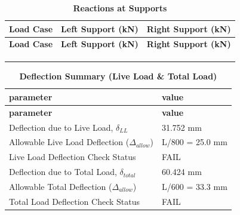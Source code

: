 \documentclass[12pt,a4paper]{report}
\numberwithin{table}{chapter}
\numberwithin{figure}{chapter}
\begin{document}
\vspace{1em}
\begin{longtable}{|>{\centering\arraybackslash}p{5.2cm}|>{\centering\arraybackslash}p{5.2cm}|>{\centering\arraybackslash}p{5.2cm}|}
\caption{\textbf{Reactions at Supports}}
\hline
\textbf{Load Case} & \textbf{Left Support (kN)} & \textbf{Right Support (kN)} \\[6pt]
\hline
\endfirsthead
\textbf{Load Case} & \textbf{Left Support (kN)} & \textbf{Right Support (kN)} \\[6pt]
\hline
\endhead
 &  &  \\[6pt]
\hline
 &  &  \\[6pt]
\hline
 &  &  \\[6pt]
\hline
\end{longtable}

\vspace{1em}
\begin{longtable}{|L{7cm}|p{8.5cm}|}
\caption{\textbf{Deflection Summary (Live Load \& Total Load)}}
\hline
\textbf{parameter} & \textbf{value} \\
\hline
\endfirsthead
\textbf{parameter} & \textbf{value} \\
\hline
\endhead
\textnormal{Deflection due to Live Load, $\delta_{LL}$} & 31.752 mm \\[6pt]
\hline
\textnormal{Allowable Live Load Deflection ($\Delta_{allow}$)} & L/800 = 25.0 mm \\[6pt]
\hline
\textnormal{Live Load Deflection Check Status} & \textcolor{reportFail}{FAIL} \\[6pt]
\hline
\textnormal{Deflection due to Total Load, $\delta_{total}$} & 60.424 mm \\[6pt]
\hline
\textnormal{Allowable Total Deflection ($\Delta_{allow}$)} & L/600 = 33.3 mm \\[6pt]
\hline
\textnormal{Total Load Deflection Check Status} & \textcolor{reportFail}{FAIL} \\[6pt]
\hline
\end{longtable}

\vspace{1em}
\noindent
\noindent{}
\noindent{}
\noindent{}
\end{document}
